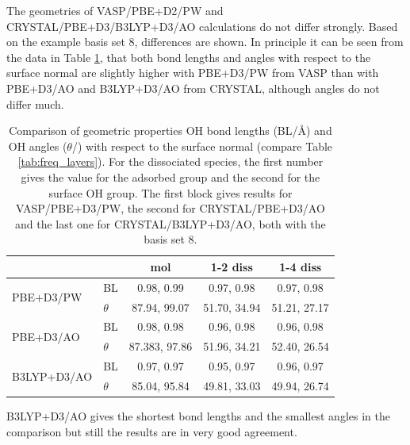 \documentclass[11pt,DIV=13,BCOR=5mm,a4paper,headinclude]{scrbook}
\begin{document}
 
The geometries of VASP/PBE+D2/PW and CRYSTAL/PBE+D3/B3LYP+D3/AO calculations do not differ strongly.
Based on the example basis set 8, differences are shown.
In principle it can be seen from the data in Table \ref{tab:geom_comp_vasp-crystal}, that both bond lengths and angles with respect to the surface normal are slightly higher with PBE+D3/PW from VASP than with PBE+D3/AO and B3LYP+D3/AO from CRYSTAL, although angles do not differ much.
\begin{table}[!h]
  \centering
   \caption{Comparison of geometric properties OH bond lengths (BL/\AA{}) and OH angles ($\theta$/\textdegree) with respect to the surface normal (compare Table \ref{tab:freq_layers}).
For the dissociated species, the first number gives the value for the adsorbed group and the second for the surface OH group.
The first block gives results for VASP/PBE+D3/PW, the second for CRYSTAL/PBE+D3/AO and the last one for CRYSTAL/B3LYP+D3/AO, both with the basis set 8.}
  \begin{tabular}{ll|ccc}
  \toprule
   &&mol & 1-2 diss & 1-4 diss \\\midrule
\multirow{2}{*}{PBE+D3/PW} &BL &0.98, 0.99 &0.97, 0.98 &0.97, 0.98 \\
&$\theta$ &87.94, 99.07 &51.70, 34.94 &51.21, 27.17 \\\midrule
\multirow{2}{*}{PBE+D3/AO}&BL &0.98, 0.98 &0.96, 0.98 &0.96, 0.98 \\
&$\theta$ &87.383, 97.86 &51.96, 34.21 &52.40, 26.54 \\\midrule
\multirow{2}{*}{B3LYP+D3/AO}& BL &0.97, 0.97 &0.95, 0.97 &0.96, 0.97 \\
&$\theta$ &85.04, 95.84 &49.81, 33.03 &49.94, 26.74 \\\bottomrule
  \end{tabular}
  \label{tab:geom_comp_vasp-crystal}
\end{table}
B3LYP+D3/AO gives the shortest bond lengths and the smallest angles in the comparison but still the results are in very good agreement.
\end{document}

